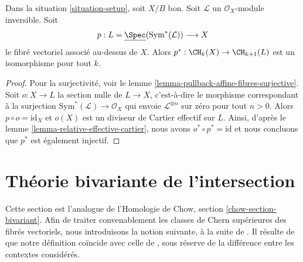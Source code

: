 \begin{lemma}
\label{lemma-linebundle}
Dans la situation \ref{situation-setup}, soit $X/B$ bon. Soit
$\mathcal{L}$ un $\mathcal{O}_X$-module inversible. Soit
$$
p :
L = \underline{\Spec}(\text{Sym}^*(\mathcal{L}))
\longrightarrow
X
$$
le fibré vectoriel associé au-dessus de $X$. Alors $p^* : \CH_k(X) \to \CH_{k +
1}(L)$ est un isomorphisme pour tout $k$.
\end{lemma}

\begin{proof}
Pour la surjectivité, voir le lemme
\ref{lemma-pullback-affine-fibres-surjective}. Soit $o : X \to L$ la section
nulle de $L \to X$, c'est-à-dire le morphisme correspondant à la surjection
$\text{Sym}^*(\mathcal{L}) \to \mathcal{O}_X$ qui envoie $\mathcal{L}^{\otimes
n}$ sur zéro pour tout $n > 0$. Alors $p \circ o = \text{id}_X$ et $o(X)$
est un diviseur de Cartier effectif sur $L$. Ainsi, d'après le lemme
\ref{lemma-relative-effective-cartier}, nous avons $o^* \circ p^* =
\text{id}$ et nous concluons que $p^*$ est également injectif.
\end{proof}























\section{Théorie bivariante de l'intersection}
\label{section-bivariant}

\noindent
Cette section est l'analogue de l'Homologie de Chow, section
\ref{chow-section-bivariant}. Afin de traiter convenablement les classes de Chern
supérieures des fibrés vectoriels, nous introduisons la notion suivante, à la
suite de \cite{FM}. Il résulte de \cite[théorème 17.1]{F} que notre définition
coïncide avec celle de \cite{F}, sous réserve de la différence entre les
contextes considérés.

